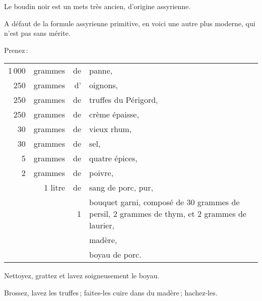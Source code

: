 Le boudin noir est un mets très ancien, d'origine assyrienne.

A défaut de la formule assyrienne primitive, en voici une autre plus moderne,
qui n'est pas sans mérite.

Prenez :

\medskip

\footnotesize
\begin{longtable}{rrrp{18em}}
  1 000 & grammes & de & panne,                                                                           \\
    250 & grammes & d' & oignons,                                                                         \\
    250 & grammes & de & truffes du Périgord,                                                             \\
    250 & grammes & de & crème épaisse,                                                                   \\
     30 & grammes & de & vieux rhum,                                                                      \\
     30 & grammes & de & sel,                                                                             \\
      5 & grammes & de & quatre épices,                                                                   \\
      2 & grammes & de & poivre,                                                                          \\
        & 1 litre & de & sang de porc, pur,                                                               \\
        &         &  1 & bouquet garni, composé de 30 grammes de persil, 2 grammes de thym,
                         et 2 grammes de laurier,                                                         \\
        &         &    & madère,                                                                          \\
        &         &    & boyau de porc.                                                                   \\
\end{longtable}
\normalsize

Nettoyez, grattez et lavez soigneusement le boyau.

Brossez, lavez les truffes ; faites-les cuire dans du madère ; hachez-les.

